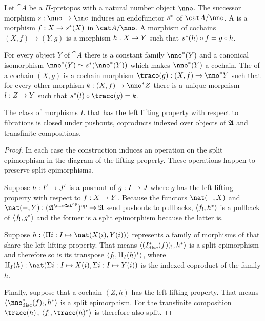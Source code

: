 \documentclass[csh.tex]{subfiles}
\begin{document}
\begin{definition} Let $\cat A$ be a $\Pi$-pretopos with a natural number object $\nno$. The successor morphism $s\of\nno\to\nno$ induces an endofunctor $s^*$ of $\cat A/\nno$. A  is a morphism $f: X\to s^*(X)$ in $\cat A/\nno$. A morphism of cochains $(X,f)\to(Y,g)$ is a morphism $h: X\to Y$ such that $s^*(h)\circ f = g\circ h$.

For every object $Y$ of $\cat A$ there is a constant family $\nno\ri(Y)$ and a canonical isomorphism $\nno\ri(Y)\simeq s\ri(\nno\ri(Y))$ which makes $\nno\ri(Y)$ a cochain. The  of a cochain $(X,g)$ is a cochain morphism $\traco(g)\of (X,f)\to\nno\ri Y$ such that for every other morphism $k\of (X,f)\to\nno\ri Z$ there is a unique morphism $l: Z\to Y$ such that $s\ri(l)\circ \traco(g)=k$.
\end{definition}

\begin{lemma} The class of morphisms $L$ that has the left lifting property with respect to fibrations is closed under pushouts, coproducts indexed over objects of $\mathfrak A$ and transfinite compositions. \label{saturation}\end{lemma}

\begin{proof}
In each case the construction induces an operation on the split epimorphism in the diagram of the lifting property. These operations happen to preserve split epimorphisms.

Suppose $h: I'\to J'$ is a pushout of $g: I\to J$ where $g$ has the left lifting property with respect to $f: X\to Y$. Because the functors $\nat(-,X)$ and $\nat(-,Y)\of(\ambient\s)\dual\to\ambient$ send pushouts to pullbacks, $\left\langle f_!,h^* \right\rangle$ is a pullback of $\left\langle f_!,g^* \right\rangle$ and the former is a split epimorphism because the latter is.

Suppose $h\of(\product{i\of I}{\nat(X(i),Y(i))})$ represents a family of morphisms of that share the left lifting property. That means $\left\langle (I_{\rm disc}^*(f))_!,h^* \right\rangle$ is a split epimorphism and therefore so is its transpose $\left\langle f_!,\amalg_I(h)^* \right\rangle$, where $\amalg_I(h)\of\nat(\coproduct{i\of I}{X(i)},\coproduct{i\of I}{Y(i)})$ is the indexed coproduct of the family $h$.%

Finally, suppose that a cochain $(Z,h)$ has the left lifting property. That means $\tuplet{\nno\disc\ri(f)_!,h\ri}$ is a split epimorphism. For the transfinite composition $\traco(h)$, $\tuplet{f_!,\traco(h)\ri}$ is therefore also split.
\end{proof}
\end{document}
